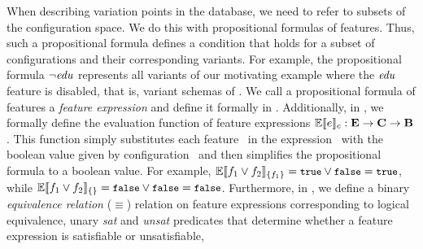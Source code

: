 When describing variation points in the database, we need to 
refer to subsets of the configuration space. We do this with
propositional formulas of features.
Thus, 
such a propositional formula defines a condition that holds for 
a subset of configurations and their corresponding variants. 
%
%
For example, the propositional formula $\neg \edu$ represents all variants of
our motivating example where the $\edu$ feature is disabled, that is, variant
schemas of . 
%
We call a propositional formula of features a \emph{feature expression} and define
it formally in . 
Additionally, in , we formally define the evaluation function of feature expressions
$\fSem \dimMeta : \ffSet \to \confSet \to \bSet$. This function simply substitutes each
feature \fName\ in the expression \dimMeta\ with the boolean value 
given by configuration \config\ and then
simplifies the propositional formula to a boolean value.
For example, 
$\fSem [\{\A\}] {\A \vee \B} = \t \vee \f = \t$, while
$\fSem [\{\}] {\A \vee \B} = \f \vee \f = \f$.
Furthermore, in , we define a binary \emph{equivalence
relation} ($\equiv$) relation on feature expressions corresponding to logical
equivalence, unary \emph{sat} and \emph{unsat} predicates that determine
whether a feature expression is satisfiable or unsatisfiable, 

